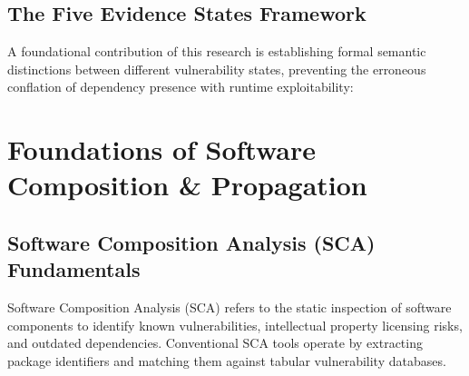 \documentclass[12pt,a4paper,oneside]{report}
\begin{document}
\section{The Five Evidence States Framework}
A foundational contribution of this research is establishing formal semantic distinctions between different vulnerability states, preventing the erroneous conflation of dependency presence with runtime exploitability:
\begin{table}[H]
    \centering
    \caption{The Five Evidence States Framework Defined in MARGVEDHA.}
    \label{tab:evidence_states}
\end{table}

\chapter{Foundations of Software Composition \& Propagation}

\section{Software Composition Analysis (SCA) Fundamentals}
Software Composition Analysis (SCA) refers to the static inspection of software components to identify known vulnerabilities, intellectual property licensing risks, and outdated dependencies. Conventional SCA tools operate by extracting package identifiers and matching them against tabular vulnerability databases. 
\end{document}
